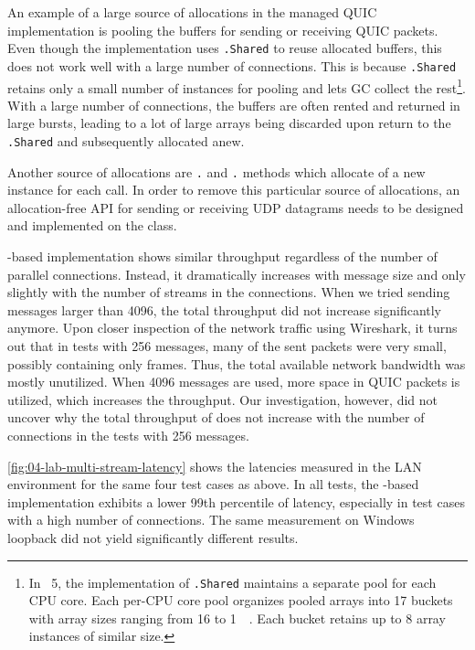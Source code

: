 An example of a large source of allocations in the managed QUIC implementation is pooling the
buffers for sending or receiving QUIC packets. Even though the implementation uses
\ArrayPoolOf{\Byte}\texttt{.Shared} to reuse allocated buffers, this does not work well with a large
number of connections. This is because \ArrayPoolOf{\Byte}\texttt{.Shared} retains only a small
number of \ArrayOf{\Byte} instances for pooling and lets GC collect the rest\footnote{In
\dotnet{}~5, the implementation of \ArrayPoolOf{\Byte}\texttt{.Shared} maintains a separate pool for
each CPU core. Each per-CPU core pool organizes pooled arrays into 17 buckets with array sizes
ranging from \SI{16}{\byte} to \SI{1}{\mebi\byte}. Each bucket retains up to 8 array instances of
similar size.}. With a large number of connections, the buffers are often rented and returned in
large bursts, leading to a lot of large arrays being discarded upon return to the
\ArrayPoolOf{\Byte}\texttt{.Shared} and subsequently allocated anew.

Another source of allocations are \Socket{}\texttt{.} and
\Socket{}\texttt{.} methods which allocate of a new  instance
for each call. In order to remove this particular source of allocations, an allocation-free API for
sending or receiving UDP datagrams needs to be designed and implemented on the \Socket{} class.

\libmsquic{}-based implementation shows similar throughput regardless of the number of parallel
connections. Instead, it dramatically increases with message size and only slightly with the number
of streams in the connections. When we tried sending messages larger than \SI{4096}{\byte}, the
total throughput did not increase significantly anymore. Upon closer inspection of the \libmsquic{}
network traffic using Wireshark, it turns out that in tests with \SI{256}{\byte} messages, many of
the sent packets were very small, possibly containing only \ACK{} frames. Thus, the total available
network bandwidth was mostly unutilized. When \SI{4096}{\byte} messages are used, more space in QUIC
packets is utilized, which increases the throughput. Our investigation, however, did not uncover why
the total throughput of \libmsquic{} does not increase with the number of connections in the tests
with \SI{256}{\byte} messages.

\autoref{fig:04-lab-multi-stream-latency} shows the latencies measured in the LAN environment for
the same four test cases as above. In all tests, the \libmsquic{}-based implementation exhibits a
lower 99th percentile of latency, especially in test cases with a high number of connections. The
same measurement on Windows loopback did not yield significantly different results.

